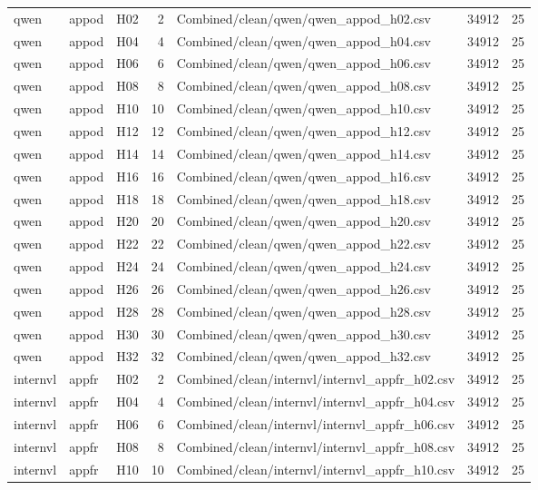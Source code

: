 \begin{longtable}{lllrlrr}
qwen & appod & H02 & 2 & Combined/clean/qwen/qwen\_appod\_h02.csv & 34912 & 25 \\
qwen & appod & H04 & 4 & Combined/clean/qwen/qwen\_appod\_h04.csv & 34912 & 25 \\
qwen & appod & H06 & 6 & Combined/clean/qwen/qwen\_appod\_h06.csv & 34912 & 25 \\
qwen & appod & H08 & 8 & Combined/clean/qwen/qwen\_appod\_h08.csv & 34912 & 25 \\
qwen & appod & H10 & 10 & Combined/clean/qwen/qwen\_appod\_h10.csv & 34912 & 25 \\
qwen & appod & H12 & 12 & Combined/clean/qwen/qwen\_appod\_h12.csv & 34912 & 25 \\
qwen & appod & H14 & 14 & Combined/clean/qwen/qwen\_appod\_h14.csv & 34912 & 25 \\
qwen & appod & H16 & 16 & Combined/clean/qwen/qwen\_appod\_h16.csv & 34912 & 25 \\
qwen & appod & H18 & 18 & Combined/clean/qwen/qwen\_appod\_h18.csv & 34912 & 25 \\
qwen & appod & H20 & 20 & Combined/clean/qwen/qwen\_appod\_h20.csv & 34912 & 25 \\
qwen & appod & H22 & 22 & Combined/clean/qwen/qwen\_appod\_h22.csv & 34912 & 25 \\
qwen & appod & H24 & 24 & Combined/clean/qwen/qwen\_appod\_h24.csv & 34912 & 25 \\
qwen & appod & H26 & 26 & Combined/clean/qwen/qwen\_appod\_h26.csv & 34912 & 25 \\
qwen & appod & H28 & 28 & Combined/clean/qwen/qwen\_appod\_h28.csv & 34912 & 25 \\
qwen & appod & H30 & 30 & Combined/clean/qwen/qwen\_appod\_h30.csv & 34912 & 25 \\
qwen & appod & H32 & 32 & Combined/clean/qwen/qwen\_appod\_h32.csv & 34912 & 25 \\
internvl & appfr & H02 & 2 & Combined/clean/internvl/internvl\_appfr\_h02.csv & 34912 & 25 \\
internvl & appfr & H04 & 4 & Combined/clean/internvl/internvl\_appfr\_h04.csv & 34912 & 25 \\
internvl & appfr & H06 & 6 & Combined/clean/internvl/internvl\_appfr\_h06.csv & 34912 & 25 \\
internvl & appfr & H08 & 8 & Combined/clean/internvl/internvl\_appfr\_h08.csv & 34912 & 25 \\
internvl & appfr & H10 & 10 & Combined/clean/internvl/internvl\_appfr\_h10.csv & 34912 & 25 \\

\end{longtable}
